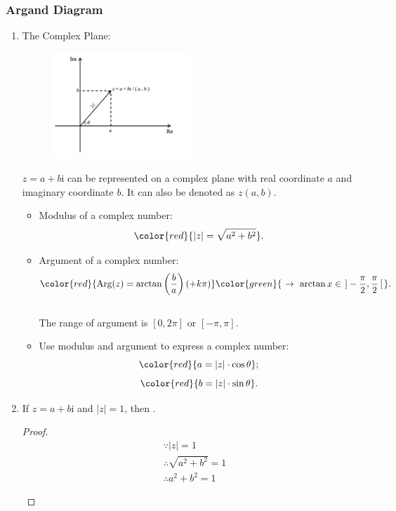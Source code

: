 \documentclass[12pt, a4paper]{article}
\newtheorem{proof}{Proof}[subsection]
\def\i{{\mathrm{i}}}
\def\Arg{{\mathrm{Arg}}}
\begin{document}
\subsubsection{Argand Diagram}
\begin{enumerate}
  \item The Complex Plane: 
  \begin{figure}[H]
    \center
    \includegraphics[width=0.5\textwidth]{Fig.1.1.jpg}
  \end{figure}
  $z=a+b\i$ can be represented on a complex plane with real coordinate $a$ and imaginary coordinate $b$. It can also be denoted as $z(a,b)$.
  \begin{itemize}
    \item Modulus of a complex number: 
    $${\color{red}{\left|z\right|=\sqrt{a^2+b^2}}}.$$
    \item Argument of a complex number: 
    $${\color{red}{\Arg(z)=\arctan\left(\frac{b}{a}\right)(+k\pi)}}{\color{green}{\ \rightarrow\ \arctan x\in\left.\right]-\frac{\pi}{2},\frac{\pi}{2}\left[\right.}}.$$
    {\color{green}{*When determine a complex number, first draw it on the plane to show which quadrant it is in.}}\\
    The range of argument is $\left[0,2\pi\right]$ or $\left[-\pi,\pi\right]$.
    \item Use modulus and argument to express a complex number: 
    $${\color{red}{a=\left|z\right|\cdot\cos\theta}};$$
    $${\color{red}{b=\left|z\right|\cdot\sin\theta}}.$$
  \end{itemize} 
  \item If $z=a+b\i$ and $|z|=1$, then {}.
  \begin{proof}
    $$\begin{aligned}
      &\because |z|=1\\
      &\therefore \sqrt{a^2+b^2}=1\\
      &\therefore a^2+b^2=1
    \end{aligned}$$
    \begin{multicols}{2}

\end{multicols}
\end{proof}
\end{enumerate}
\end{document}
